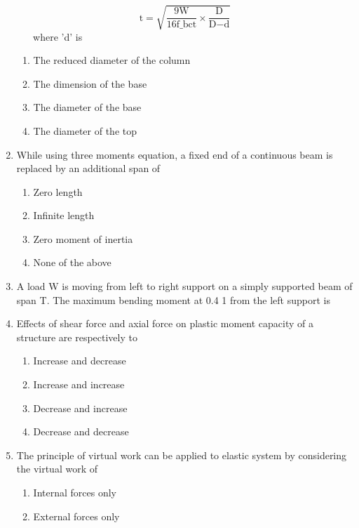 \documentclass[11pt,a4paper]{article}
\begin{document}
\begin{enumerate}
{$${\text{t}} = \sqrt {\frac{{9{\text{W}}}}{{16{{\text{f}}\_{{\text{bct}}}}}} \times \frac{{\text{D}}}{{{\text{D}} - {\text{d}}}}} $$ ~ ~ where 'd' is
}
\begin{enumerate}[label=\Alph*.]
\item{The reduced diameter of the column}
\item{The dimension of the base}
\item{The diameter of the base}
\item{The diameter of the top}
\end{enumerate}
\item{While using three moments equation, a fixed end of a continuous beam is replaced by an additional span of}
\begin{enumerate}[label=\Alph*.]
\item{Zero length}
\item{Infinite length}
\item{Zero moment of inertia}
\item{None of the above}
\end{enumerate}
\item{A load W is moving from left to right support on a simply supported beam of span T. The maximum bending moment at 0.4 1 from the left support is
}
\\
\item{Effects of shear force and axial force on plastic moment capacity of a structure are respectively to}
\begin{enumerate}[label=\Alph*.]
\item{Increase and decrease}
\item{Increase and increase}
\item{Decrease and increase}
\item{Decrease and decrease}
\end{enumerate}
\item{The principle of virtual work can be applied to elastic system by considering the virtual work of}
\begin{enumerate}[label=\Alph*.]
\item{Internal forces only}
\item{External forces only}

\end{enumerate}
\end{enumerate}
\end{document}
